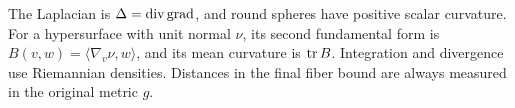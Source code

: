 \begin{convention}\label{conv:signs}
The Laplacian is \(\Delta=\operatorname{div}\operatorname{grad}\), and round spheres have positive
scalar curvature. For a hypersurface with unit normal \(\nu\), its
second fundamental form is
\(B(v,w)=\langle\nabla_v\nu,w\rangle\), and its mean curvature is
\(\operatorname{tr} B\). Integration and divergence use Riemannian densities. Distances in the final fiber bound are always
measured in the original metric \(g\).
\end{convention}
